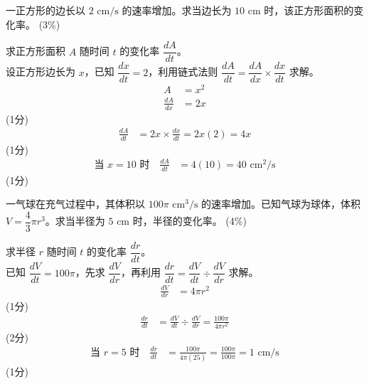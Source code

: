 \documentclass[12pt,a4paper]{exam-zh}
\begin{document}
\begin{question}[points = 3]
    一正方形的边长以 $2\text{ cm/s}$ 的速率增加。求当边长为 $10\text{ cm}$ 时，该正方形面积的变化率。
    \hfill (3\%)
\end{question}

\begin{solution}
    求正方形面积 $A$ 随时间 $t$ 的变化率 $\dfrac{dA}{dt}$。 \\
    设正方形边长为 $x$，已知 $\dfrac{dx}{dt}=2$，利用链式法则 $\dfrac{dA}{dt}=\dfrac{dA}{dx}\times\dfrac{dx}{dt}$ 求解。
    \begin{align*}
        A &= x^2 \\
        \frac{dA}{dx} &= 2x
    \end{align*}
    \hfill (1分) \\
    \begin{align*}
        \frac{dA}{dt} &= 2x\times\frac{dx}{dt} = 2x(2) = 4x
    \end{align*}
    \hfill (1分) \\
    \begin{align*}
        \text{当 } x=10 \text{ 时} \quad \frac{dA}{dt} &= 4(10) = 40\text{ cm}^2/\text{s}
    \end{align*}
    \hfill (1分)
\end{solution}

\begin{question}[points = 4]
    一气球在充气过程中，其体积以 $100\pi\text{ cm}^3/\text{s}$ 的速率增加。已知气球为球体，体积 $V=\dfrac{4}{3}\pi r^3$。求当半径为 $5\text{ cm}$ 时，半径的变化率。
    \hfill (4\%)
\end{question}

\begin{solution}
    求半径 $r$ 随时间 $t$ 的变化率 $\dfrac{dr}{dt}$。 \\
    已知 $\dfrac{dV}{dt}=100\pi$，先求 $\dfrac{dV}{dr}$，再利用 $\dfrac{dr}{dt}=\dfrac{dV}{dt}\div\dfrac{dV}{dr}$ 求解。
    \begin{align*}
        \frac{dV}{dr} &= 4\pi r^2
    \end{align*}
    \hfill (1分) \\
    \begin{align*}
        \frac{dr}{dt} &= \frac{dV}{dt}\div\frac{dV}{dr} = \frac{100\pi}{4\pi r^2}
    \end{align*}
    \hfill (2分) \\
    \begin{align*}
        \text{当 } r=5 \text{ 时} \quad \frac{dr}{dt} &= \frac{100\pi}{4\pi(25)} = \frac{100\pi}{100\pi} = 1\text{ cm/s}
    \end{align*}
    \hfill (1分)
\end{solution}
\end{document}
